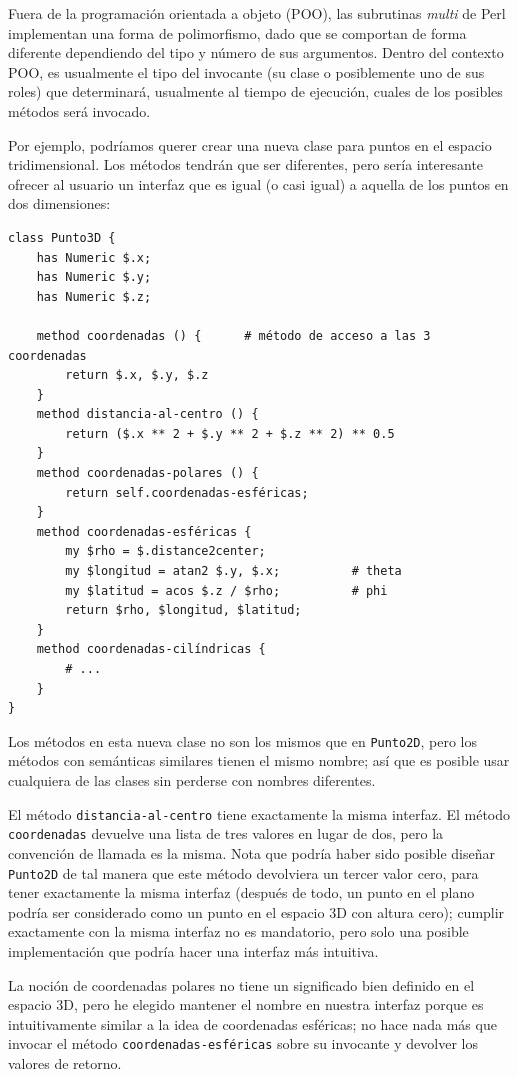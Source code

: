 Fuera de la programación orientada a objeto (POO), las subrutinas
\emph{multi} de Perl implementan una forma de polimorfismo,
dado que se comportan de forma diferente dependiendo del tipo
y número de sus argumentos. Dentro del contexto POO, es
usualmente el tipo del invocante (su clase o posiblemente uno de
sus roles) que determinará, usualmente al tiempo de 
ejecución, cuales de los posibles métodos será invocado.

Por ejemplo, podríamos querer crear una nueva clase para 
puntos en el espacio tridimensional. Los métodos tendrán 
que ser diferentes, pero sería interesante ofrecer al usuario
un interfaz que es igual (o casi igual)  a aquella de los
puntos en dos dimensiones:

\begin{verbatim}
class Punto3D {
    has Numeric $.x;
    has Numeric $.y;
    has Numeric $.z;
    
    method coordenadas () {      # método de acceso a las 3 coordenadas
    	return $.x, $.y, $.z
    }
    method distancia-al-centro () {
        return ($.x ** 2 + $.y ** 2 + $.z ** 2) ** 0.5
    }
    method coordenadas-polares () {
    	return self.coordenadas-esféricas;
    }
    method coordenadas-esféricas {
    	my $rho = $.distance2center;
    	my $longitud = atan2 $.y, $.x;          # theta
    	my $latitud = acos $.z / $rho;          # phi 
    	return $rho, $longitud, $latitud;
    }
    method coordenadas-cilíndricas {
    	# ...
    }
}
\end{verbatim}

Los métodos en esta nueva clase no son los mismos que 
en {\tt Punto2D}, pero los métodos con semánticas similares
tienen el mismo nombre; así que es posible usar cualquiera
de las clases sin perderse con nombres diferentes.

El método {\tt distancia-al-centro} tiene exactamente la misma interfaz. El método {\tt coordenadas} devuelve una lista de tres 
valores en lugar de dos, pero la convención de llamada es la misma. Nota que podría haber sido posible diseñar {\tt Punto2D}
de tal manera que este método devolviera un tercer valor cero, 
para tener exactamente la misma interfaz (después de todo, un punto en el plano podría ser considerado como un punto en el 
espacio 3D con altura cero); cumplir exactamente con la misma
interfaz no es mandatorio, pero solo una posible implementación
que podría hacer una interfaz más intuitiva.
 

La noción de coordenadas polares no tiene un significado 
bien definido en el espacio 3D, pero he elegido mantener el nombre
en nuestra interfaz porque es intuitivamente similar a la idea
de coordenadas esféricas; no hace nada más que invocar 
el método \verb|coordenadas-esféricas| sobre su invocante y
devolver los valores de retorno.

